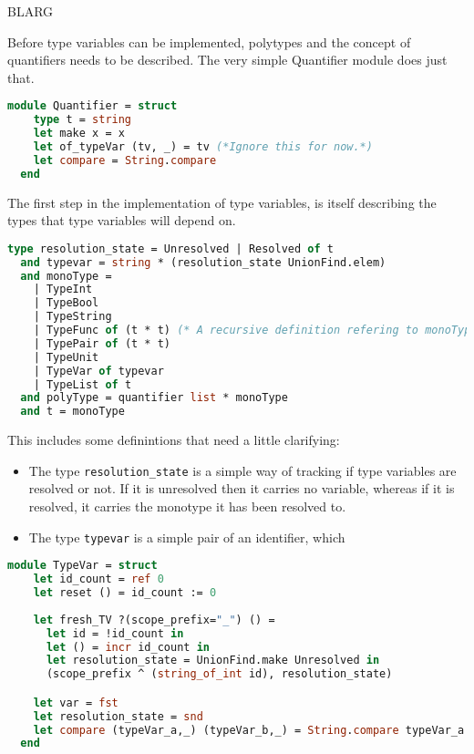 \documentclass{l4proj}
\begin{document}
BLARG



Before type variables can be implemented, polytypes and the concept of quantifiers needs to be described.
The very simple Quantifier module does just that.

\begin{lstlisting}[language=Caml]
  module Quantifier = struct
    type t = string
    let make x = x
    let of_typeVar (tv, _) = tv (*Ignore this for now.*)
    let compare = String.compare
  end
\end{lstlisting}

The first step in the implementation of type variables, is itself describing the types that type variables will depend on.

\begin{lstlisting}[language=Caml]
  type resolution_state = Unresolved | Resolved of t
  and typevar = string * (resolution_state UnionFind.elem)
  and monoType = 
    | TypeInt
    | TypeBool
    | TypeString
    | TypeFunc of (t * t) (* A recursive definition refering to monoType. *)
    | TypePair of (t * t)
    | TypeUnit
    | TypeVar of typevar
    | TypeList of t
  and polyType = quantifier list * monoType
  and t = monoType
\end{lstlisting}

This includes some definintions that need a little clarifying:
\begin{itemize}
    \item The type \texttt{resolution\_state} is a simple way of tracking if type variables are resolved or not.
    If it is unresolved then it carries no variable, whereas if it is resolved, it carries the monotype it has been resolved to.
    \item The type \texttt{typevar} is a simple pair of an identifier, which
\end{itemize}

\begin{lstlisting}[language=Caml, caption=The TypeVar module. The module specifies the utility functions for the management of type variables.]
  module TypeVar = struct
    let id_count = ref 0
    let reset () = id_count := 0
    
    let fresh_TV ?(scope_prefix="_") () =
      let id = !id_count in
      let () = incr id_count in
      let resolution_state = UnionFind.make Unresolved in
      (scope_prefix ^ (string_of_int id), resolution_state)

    let var = fst
    let resolution_state = snd
    let compare (typeVar_a,_) (typeVar_b,_) = String.compare typeVar_a typeVar_b
  end
\end{lstlisting}
\end{document}
